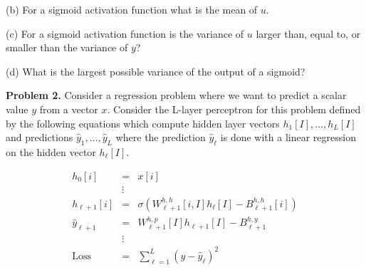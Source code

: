\documentclass{article}
\newcommand{\solution}[1]{}
\begin{document}
\medskip
(b) For a sigmoid activation function what is the mean of $u$.

\solution{
  We are given that the probability that $W[i] = z$ is the same as the probability of $w[i]= -z$.  This implies that for a given value of
  $x[i]$ we have that the probability that $w[i]x[i] = z$ equals the probability that $w[i]x[i] = -z$.  This further implies that, for a given value $y$, the
  probability that $\sum_i w[i]z[i] = y$ equals the probability that $\sum_i w[i]x[i] = -y$.  So the input to the sigmoid is distributed symmetrically about 0.
  Since the sigmoid function is itself symmetric about 0, we get that the expected value of the output of the sigmoid is its value at zero which is 1/2.
}

\medskip
(c) For a sigmoid activation function
is the variance of $u$ larger than, equal to, or smaller than the variance of $y$?

\solution{
  The variance is smaller.  To show this it suffices to show that the slope of the sigmoid function is everywhere less than 1.  The slope is largest at the input zero.
  The sigmoid function is
  $$f(z) = \frac{1}{1 + e^{-y}}$$
  The slope is
  $$f'(y) = \frac{e^{-y}}{(1+e^{-y})^2}$$
  which equals $1/4$ at $y = 0$.
}

\medskip
(d) What is the largest possible variance of the output of a sigmoid?

\solution{
  The larest valriance occurs when $y = \infty$ with probability 1/2 and $y = -\infty$ with probability 1/2 ;-).  Tn this case $f(y)$ is 0 with probability 1/2 and 1 with probability 1/2.
  Which gives a variance of 1/4.
}

\bigskip
{\bf Problem 2.}  Consider a regression problem where we want to predict a scalar value $y$ from a vector $x$.
Consider the L-layer perceptron for this problem defined by the following equations
which compute hidden layer vectors $h_1[I], \ldots, h_L[I]$ and predictions $\hat{y}_1, \ldots, \hat{y}_L$ where
the prediction $\hat{y}_\ell$ is done with a linear regression on the hidden vector $h_\ell[I]$.

\begin{eqnarray*}
  h_0[i] & = & x[i] \\
  & \vdots & \\
  h_{\ell+1}[i] & = & \sigma(W^{h,h}_{\ell+1}[i,I]h_\ell[I] - B^{h,h}_{\ell+1}[i]) \\
  \hat{y}_{\ell +1} & = & W^{h,p}_{\ell+1}[I]h_{\ell+1}[I]- B^{h,y}_{\ell+1} \\
  & \vdots & \\
  \mathrm{Loss} & = & \sum_{\ell = 1}^L (y - \hat{y}_\ell)^2
\end{eqnarray*}
\end{document}
